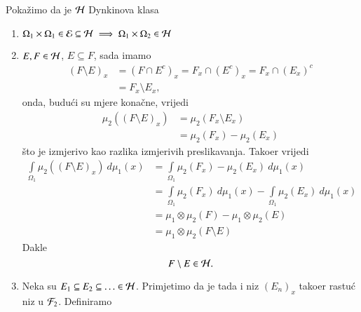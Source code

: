 \begin{rj}[\ref{zad:4.15}]
    Poka\v zimo da je $\mathcal{H}$ Dynkinova klasa
    \begin{enumerate}[label=(\roman*)]
        \item
        $\Omega_1 \times \Omega_1 \in \mathcal{E} \subseteq \mathcal{H} \implies \Omega_1 \times \Omega_2 \in \mathcal{H}$
        \item $E, F \in \mathcal{H}$, $E \subseteq F$, sada imamo
        \begin{equation*}
            \begin{aligned}
                (F \setminus E)_x &= (F \cap E^c)_x = F_x \cap (E^c)_x = F_x \cap (E_x)^c\\
                &= F_x \setminus E_x,
            \end{aligned}
        \end{equation*}
        onda, budu\' ci su mjere kona\v cne, vrijedi
        \begin{equation*}
            \begin{aligned}
                \mu_2 ((F \setminus E)_x) &= \mu_2 (F_x \setminus E_x)\\
                &= \mu_2 (F_x) - \mu_2 (E_x)
            \end{aligned}
        \end{equation*}
        \v sto je izmjerivo kao razlika izmjerivih preslikavanja.
        Tako\dj er vrijedi
        \begin{equation*}
            \begin{aligned}
                \int\limits_{\Omega_1} \mu_2 ((F \setminus E)_x) \: d \mu_1 (x) &= \int\limits_{\Omega_1} \mu_2 (F_x) - \mu_2 (E_x) \: d \mu_1 (x)\\
                &= \int\limits_{\Omega_1} \mu_2 (F_x) \: d \mu_1 (x) - \int\limits_{\Omega_1} \mu_2 (E_x) \: d \mu_1 (x)\\
                &= \mu_1 \otimes \mu_2 (F) - \mu_1 \otimes \mu_2 (E)\\
                &= \mu_1 \otimes \mu_2 (F \setminus E)
            \end{aligned}
        \end{equation*}
        Dakle
        \begin{equation*}
            F \setminus E \in \mathcal{H}.
        \end{equation*}
        \item
        Neka su $E_1 \subseteq E_2 \subseteq \ldots \in \mathcal{H}$.
        Primjetimo da je tada i niz $(E_n)_x$ tako\dj er rastu\' c niz u $\mathcal{F}_2$.
        Definiramo
        \begin{equation*}

\end{equation*}
\end{enumerate}
\end{rj}
